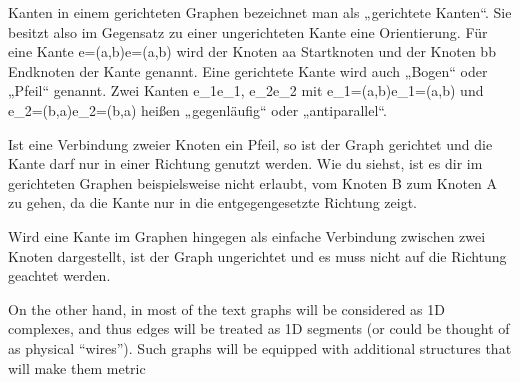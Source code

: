Kanten in einem gerichteten Graphen bezeichnet man als „gerichtete Kanten“. Sie besitzt also im Gegensatz zu einer ungerichteten Kante eine Orientierung. Für eine Kante {\displaystyle e=\left(a,b\right)}e=\left(a,b\right) wird der Knoten {\displaystyle a}a Startknoten und der Knoten {\displaystyle b}b Endknoten der Kante genannt. Eine gerichtete Kante wird auch „Bogen“ oder „Pfeil“ genannt. Zwei Kanten {\displaystyle e_{1}}e_{1}, {\displaystyle e_{2}}e_{2} mit {\displaystyle e_{1}=\left(a,b\right)}e_{1}=\left(a,b\right) und {\displaystyle e_{2}=\left(b,a\right)}e_{2}=\left(b,a\right) heißen „gegenläufig“ oder „antiparallel“.


Ist eine Verbindung zweier Knoten ein Pfeil, so ist der Graph gerichtet und die Kante darf nur in einer Richtung genutzt werden. Wie du siehst, ist es dir im gerichteten Graphen beispielsweise nicht erlaubt, vom Knoten B zum Knoten A zu gehen, da die Kante nur in die entgegengesetzte Richtung zeigt.

Wird eine Kante im Graphen hingegen als einfache Verbindung zwischen zwei Knoten dargestellt, ist der Graph ungerichtet und es muss nicht auf die Richtung geachtet werden.


On the other hand, in
most of the text graphs will be considered as 1D complexes, and thus
edges will be treated as 1D segments (or could be thought of as physical
“wires”). Such graphs will be equipped with additional structures that
will make them metric
